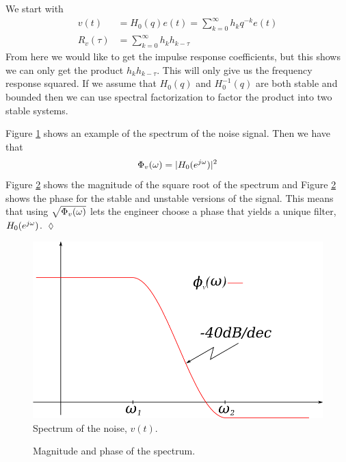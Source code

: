 We start with
\begin{align*}
v(t) &= H_0(q)e(t) = \sum_{k=0}^\infty h_kq^{-k}e(t) \\
R_v(\tau) &= \sum_{k=0}^\infty h_kh_{k-\tau}
\end{align*}
From here we would like to get the impulse response coefficients, but this shows we can only get the product $h_kh_{k-\tau}$. This will only give us the frequency response squared. If we assume that $H_0(q)$ and $H_0^{-1}(q)$ are both stable and bounded then we can use spectral factorization to factor the product into two stable systems.

\begin{example}
Figure \ref{fig:07spectrum} shows an example of the spectrum of the noise signal. Then we have that
$$\Phi_v(\omega) = |H_0(e^{j\omega})|^2$$
Figure \ref{fig:07magphase} shows the magnitude of the square root of the spectrum and Figure \ref{fig:07magphase} shows the phase for the stable and unstable versions of the signal. This means that using $\sqrt{\Phi_v(\omega)}$ lets the engineer choose a phase that yields a unique filter, $H_0(e^{j\omega})$.
$\lozenge$
\end{example}

\begin{figure}[ht!]
  \centering
  \includegraphics[width=.5\textwidth]{images/07spectrum}
  \caption{Spectrum of the noise, $v(t)$.}
  \label{fig:07spectrum}
\end{figure}

\begin{figure}[ht!]
  \centering
   \hfill
   \hfill
  \caption{Magnitude and phase of the spectrum.}
  \label{fig:07magphase}
\end{figure}

